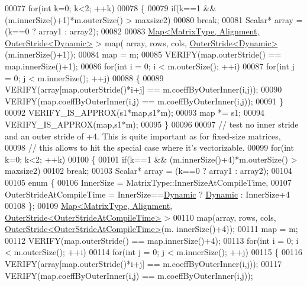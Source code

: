 \begin{DoxyCode}
00077   \textcolor{keywordflow}{for}(\textcolor{keywordtype}{int} k=0; k<2; ++k)
00078   \{
00079     \textcolor{keywordflow}{if}(k==1 && (m.innerSize()+1)*m.outerSize() > maxsize2)
00080       \textcolor{keywordflow}{break};
00081     Scalar* array = (k==0 ? array1 : array2);
00082     
00083     \hyperlink{group___core___module_class_eigen_1_1_map}{Map<MatrixType, Alignment, OuterStride<Dynamic>} > map(
      array, rows, cols, \hyperlink{class_eigen_1_1_outer_stride}{OuterStride<Dynamic>}(m.innerSize()+1));
00084     map = m;
00085     VERIFY(map.outerStride() == map.innerSize()+1);
00086     \textcolor{keywordflow}{for}(\textcolor{keywordtype}{int} i = 0; i < m.outerSize(); ++i)
00087       \textcolor{keywordflow}{for}(\textcolor{keywordtype}{int} j = 0; j < m.innerSize(); ++j)
00088       \{
00089         VERIFY(array[map.outerStride()*i+j] == m.coeffByOuterInner(i,j));
00090         VERIFY(map.coeffByOuterInner(i,j) == m.coeffByOuterInner(i,j));
00091       \}
00092     VERIFY\_IS\_APPROX(s1*map,s1*m);
00093     map *= s1;
00094     VERIFY\_IS\_APPROX(map,s1*m);
00095   \}
00096 
00097   \textcolor{comment}{// test no inner stride and an outer stride of +4. This is quite important as for fixed-size matrices,}
00098   \textcolor{comment}{// this allows to hit the special case where it's vectorizable.}
00099   \textcolor{keywordflow}{for}(\textcolor{keywordtype}{int} k=0; k<2; ++k)
00100   \{
00101     \textcolor{keywordflow}{if}(k==1 && (m.innerSize()+4)*m.outerSize() > maxsize2)
00102       \textcolor{keywordflow}{break};
00103     Scalar* array = (k==0 ? array1 : array2);
00104     
00105     \textcolor{keyword}{enum} \{
00106       InnerSize = MatrixType::InnerSizeAtCompileTime,
00107       OuterStrideAtCompileTime = InnerSize==\hyperlink{namespace_eigen_ad81fa7195215a0ce30017dfac309f0b2}{Dynamic} ? \hyperlink{namespace_eigen_ad81fa7195215a0ce30017dfac309f0b2}{Dynamic} : InnerSize+4
00108     \};
00109     \hyperlink{group___core___module_class_eigen_1_1_map}{Map<MatrixType, Alignment, OuterStride<OuterStrideAtCompileTime>}
       >
00110       map(array, rows, cols, \hyperlink{class_eigen_1_1_outer_stride}{OuterStride<OuterStrideAtCompileTime>}(m.
      innerSize()+4));
00111     map = m;
00112     VERIFY(map.outerStride() == map.innerSize()+4);
00113     \textcolor{keywordflow}{for}(\textcolor{keywordtype}{int} i = 0; i < m.outerSize(); ++i)
00114       \textcolor{keywordflow}{for}(\textcolor{keywordtype}{int} j = 0; j < m.innerSize(); ++j)
00115       \{
00116         VERIFY(array[map.outerStride()*i+j] == m.coeffByOuterInner(i,j));
00117         VERIFY(map.coeffByOuterInner(i,j) == m.coeffByOuterInner(i,j));

\end{DoxyCode}
